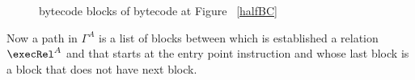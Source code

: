 
\begin{figure}[p]
\begin{center}
\end{center}
\caption{bytecode blocks of bytecode at Figure ~\ref{halfBC}}
\label{blockBC}
\end{figure}

Now a path in $\Gamma^A$  is a list of blocks between which is established a relation $\execRel^A$ and that starts at the entry point instruction and whose last block is a block that does not have next block.

